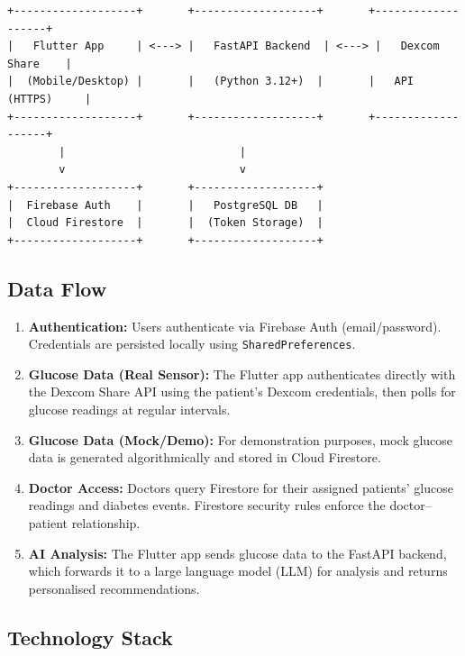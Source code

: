 \documentclass[12pt,a4paper]{article}
\begin{document}
\begin{verbatim}
+-------------------+       +-------------------+       +-------------------+
|   Flutter App     | <---> |   FastAPI Backend  | <---> |   Dexcom Share    |
|  (Mobile/Desktop) |       |   (Python 3.12+)  |       |   API (HTTPS)     |
+-------------------+       +-------------------+       +-------------------+
        |                           |
        v                           v
+-------------------+       +-------------------+
|  Firebase Auth    |       |   PostgreSQL DB   |
|  Cloud Firestore  |       |  (Token Storage)  |
+-------------------+       +-------------------+
\end{verbatim}

\subsection{Data Flow}

\begin{enumerate}
    \item \textbf{Authentication:} Users authenticate via Firebase Auth (email/password). Credentials are persisted locally using \texttt{SharedPreferences}.
    \item \textbf{Glucose Data (Real Sensor):} The Flutter app authenticates directly with the Dexcom Share API using the patient's Dexcom credentials, then polls for glucose readings at regular intervals.
    \item \textbf{Glucose Data (Mock/Demo):} For demonstration purposes, mock glucose data is generated algorithmically and stored in Cloud Firestore.
    \item \textbf{Doctor Access:} Doctors query Firestore for their assigned patients' glucose readings and diabetes events. Firestore security rules enforce the doctor--patient relationship.
    \item \textbf{AI Analysis:} The Flutter app sends glucose data to the FastAPI backend, which forwards it to a large language model (LLM) for analysis and returns personalised recommendations.
\end{enumerate}

\subsection{Technology Stack}
\end{document}
